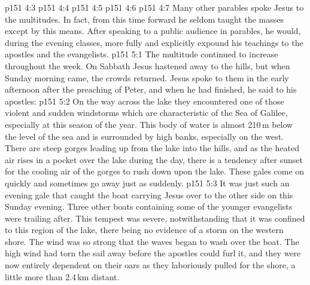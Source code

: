 \vs p151 4:3 \pc {}
\vs p151 4:4 \pc {}
\vs p151 4:5 \pc {}
\vs p151 4:6 \pc {}
\vs p151 4:7 \pc Many other parables spoke Jesus to the multitudes. In fact, from this time forward he seldom taught the masses except by this means. After speaking to a public audience in parables, he would, during the evening classes, more fully and explicitly expound his teachings to the apostles and the evangelists.
\vs p151 5:1 The multitude continued to increase throughout the week. On Sabbath Jesus hastened away to the hills, but when Sunday morning came, the crowds returned. Jesus spoke to them in the early afternoon after the preaching of Peter, and when he had finished, he said to his apostles: 
\vs p151 5:2 On the way across the lake they encountered one of those violent and sudden windstorms which are characteristic of the Sea of Galilee, especially at this season of the year. This body of water is almost 210\,m below the level of the sea and is surrounded by high banks, especially on the west. There are steep gorges leading up from the lake into the hills, and as the heated air rises in a pocket over the lake during the day, there is a tendency after sunset for the cooling air of the gorges to rush down upon the lake. These gales come on quickly and sometimes go away just as suddenly.
\vs p151 5:3 It was just such an evening gale that caught the boat carrying Jesus over to the other side on this Sunday evening. Three other boats containing some of the younger evangelists were trailing after. This tempest was severe, notwithstanding that it was confined to this region of the lake, there being no evidence of a storm on the western shore. The wind was so strong that the waves began to wash over the boat. The high wind had torn the sail away before the apostles could furl it, and they were now entirely dependent on their oars as they laboriously pulled for the shore, a little more than 2.4\,km distant.
